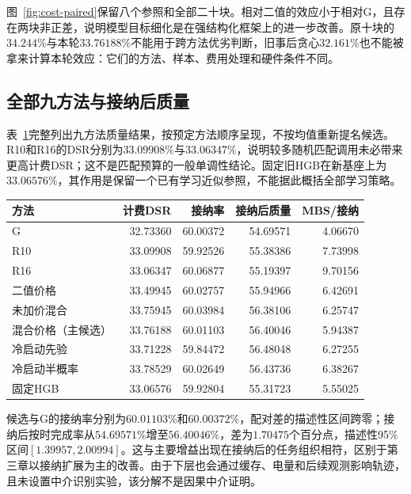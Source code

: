 图~\ref{fig:cost-paired}保留八个参照和全部二十块。相对二值的效应小于相对G，且存在两块非正差，说明模型目标细化是在强结构化框架上的进一步改善。原十块的$34.244\%$与本轮$33.76188\%$不能用于跨方法优劣判断，旧事后贪心$32.161\%$也不能被拿来计算本轮效应：它们的方法、样本、费用处理和硬件条件不同。

\subsection{全部九方法与接纳后质量}
表~\ref{tab:cost-quality}完整列出九方法质量结果，按预定方法顺序呈现，不按均值重新提名候选。R10和R16的DSR分别为$33.09908\%$与$33.06347\%$，说明较多随机匹配调用未必带来更高计费DSR；这不是匹配预算的一般单调性结论。固定旧HGB在新基座上为$33.06576\%$，其作用是保留一个已有学习近似参照，不能据此概括全部学习策略。

\begin{table}[!htbp]
\centering
{}
\label{tab:cost-quality}
\small
\setlength{\tabcolsep}{5pt}
\begin{tabular}{lrrrr}
\toprule
方法 & 计费DSR & 接纳率 & 接纳后质量 & MBS/接纳\\
\midrule
G & 32.73360 & 60.00372 & 54.69571 & 4.06670\\
R10 & 33.09908 & 59.92526 & 55.38386 & 7.73998\\
R16 & 33.06347 & 60.06877 & 55.19397 & 9.70156\\
二值价格 & 33.49945 & 60.02757 & 55.94966 & 6.42691\\
未加价混合 & 33.75945 & 60.03984 & 56.38106 & 6.25747\\
混合价格（主候选） & 33.76188 & 60.01103 & 56.40046 & 5.94387\\
冷启动先验 & 33.71228 & 59.84472 & 56.48048 & 6.27255\\
冷启动半概率 & 33.78529 & 60.02649 & 56.43736 & 6.38267\\
固定HGB & 33.06576 & 59.92804 & 55.31723 & 5.55025\\
\bottomrule
\end{tabular}
\end{table}

候选与G的接纳率分别为$60.01103\%$和$60.00372\%$，配对差的描述性区间跨零；接纳后按时完成率从$54.69571\%$增至$56.40046\%$，差为$1.70475$个百分点，描述性95\%区间$[1.39957,2.00994]$。这与主要增益出现在接纳后的任务组织相符，区别于第三章以接纳扩展为主的改善。由于下层也会通过缓存、电量和后续观测影响轨迹，且未设置中介识别实验，该分解不是因果中介证明。

